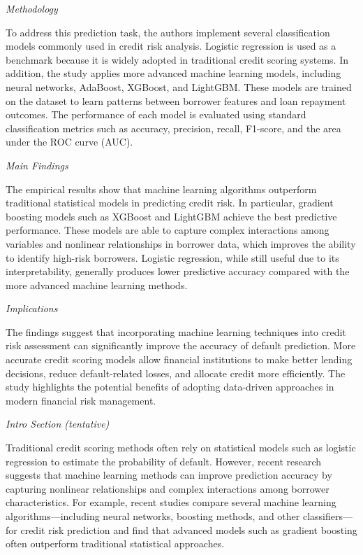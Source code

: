 \documentclass[letterpaper]{article}
\begin{document}
	\medskip
	
	\textit{Methodology}
	
	To address this prediction task, the authors implement several classification models commonly used in credit risk analysis. Logistic regression is used as a benchmark because it is widely adopted in traditional credit scoring systems. In addition, the study applies more advanced machine learning models, including neural networks, AdaBoost, XGBoost, and LightGBM. These models are trained on the dataset to learn patterns between borrower features and loan repayment outcomes. The performance of each model is evaluated using standard classification metrics such as accuracy, precision, recall, F1-score, and the area under the ROC curve (AUC).
	
	\medskip
	
	\textit{Main Findings}
	
	The empirical results show that machine learning algorithms outperform traditional statistical models in predicting credit risk. In particular, gradient boosting models such as XGBoost and LightGBM achieve the best predictive performance. These models are able to capture complex interactions among variables and nonlinear relationships in borrower data, which improves the ability to identify high-risk borrowers. Logistic regression, while still useful due to its interpretability, generally produces lower predictive accuracy compared with the more advanced machine learning methods.
	
	\medskip
	
	\textit{Implications}
	
	The findings suggest that incorporating machine learning techniques into credit risk assessment can significantly improve the accuracy of default prediction. More accurate credit scoring models allow financial institutions to make better lending decisions, reduce default-related losses, and allocate credit more efficiently. The study highlights the potential benefits of adopting data-driven approaches in modern financial risk management.
	
	\medskip
	
	\textit{Intro Section (tentative)}
	
	Traditional credit scoring methods often rely on statistical models such as logistic regression to estimate the probability of default. However, recent research suggests that machine learning methods can improve prediction accuracy by capturing nonlinear relationships and complex interactions among borrower characteristics. For example, recent studies compare several machine learning algorithms---including neural networks, boosting methods, and other classifiers---for credit risk prediction and find that advanced models such as gradient boosting often outperform traditional statistical approaches.
	
\end{document}
